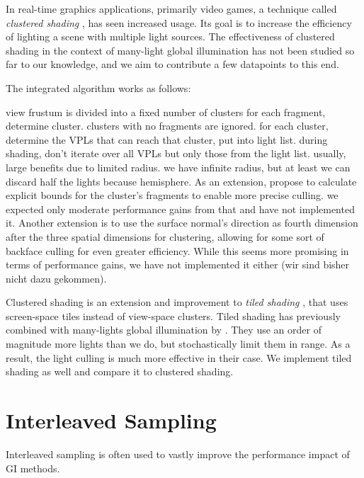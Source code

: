 In real-time graphics applications, primarily video games, a technique called \textit{clustered shading} \citep{olsson2012clustered}, has seen increased usage. Its goal is to increase the efficiency of lighting a scene with multiple light sources.
The effectiveness of clustered shading in the context of many-light global illumination has not been studied so far to our knowledge, and we aim to contribute a few datapoints to this end.

The integrated algorithm works as follows:
\begin{outline}
\1 view frustum is divided into a fixed number of clusters
\1 for each fragment, determine cluster. clusters with no fragments are ignored.
\1 for each cluster, determine the VPLs that can reach that cluster, put into light list.
\1 during shading, don't iterate over all VPLs but only those from the light list.
\1 usually, large benefits due to limited radius. we have infinite radius, but at least we can discard half the lights because hemisphere.
\1 As an extension, \citet{olsson2012clustered} propose to calculate explicit bounds for the cluster's fragments to enable more precise culling. we expected only moderate performance gains from that and have not implemented it.
\1 Another extension is to use the surface normal's direction as fourth dimension after the three spatial dimensions for clustering, allowing for some sort of backface culling for even greater efficiency. While this seems more promising in terms of performance gains, we have not implemented it either (wir sind bisher nicht dazu gekommen).
\end{outline}

Clustered shading is an extension and improvement to \textit{tiled shading} \citep{Olsson:2011:TiledShading}, that uses screen-space tiles instead of view-space clusters. Tiled shading has previously combined with many-lights global illumination by \citet{Tokuyoshi:2016:Stochastic}. They use an order of magnitude more lights than we do, but stochastically limit them in range. As a result, the light culling is much more effective in their case.
We implement tiled shading as well and compare it to clustered shading.


\section{Interleaved Sampling}
\label{sec:concept:interleavedSampling}
Interleaved sampling \citep{Keller:2001:InterleavedSampling} is often used to vastly improve the performance impact of GI methods.

